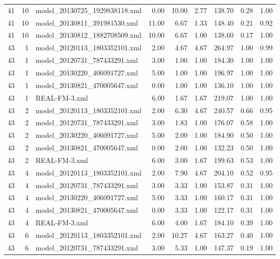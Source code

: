 \begin{table}[ht]
\begin{tabular}{rrlrrrrrr}
   41 &  10 & model\_20130725\_1929838118.xml & 0.00 & 10.00 & 2.77 & 138.70 & 0.28 & 1.00 \\ 
   41 &  10 & model\_20130811\_391981530.xml & 11.00 & 6.67 & 1.33 & 148.40 & 0.21 & 0.92 \\ 
   41 &  10 & model\_20130812\_1882708509.xml & 10.00 & 6.67 & 1.00 & 138.60 & 0.17 & 1.00 \\ 
   43 &   1 & model\_20120113\_1803352101.xml & 2.00 & 4.67 & 4.67 & 264.97 & 1.00 & 0.99 \\ 
   43 &   1 & model\_20120731\_787433291.xml & 3.00 & 1.00 & 1.00 & 184.30 & 1.00 & 1.00 \\ 
   43 &   1 & model\_20130220\_406091727.xml & 5.00 & 1.00 & 1.00 & 196.97 & 1.00 & 1.00 \\ 
   43 &   1 & model\_20130821\_470005647.xml & 0.00 & 1.00 & 1.00 & 136.10 & 1.00 & 1.00 \\ 
   43 &   1 & REAL-FM-3.xml & 6.00 & 1.67 & 1.67 & 219.07 & 1.00 & 1.00 \\ 
   43 &   2 & model\_20120113\_1803352101.xml & 2.00 & 6.30 & 4.67 & 240.57 & 0.66 & 0.95 \\ 
   43 &   2 & model\_20120731\_787433291.xml & 3.00 & 1.83 & 1.00 & 176.07 & 0.58 & 1.00 \\ 
   43 &   2 & model\_20130220\_406091727.xml & 5.00 & 2.00 & 1.00 & 184.90 & 0.50 & 1.00 \\ 
   43 &   2 & model\_20130821\_470005647.xml & 0.00 & 2.00 & 1.00 & 132.23 & 0.50 & 1.00 \\ 
   43 &   2 & REAL-FM-3.xml & 6.00 & 3.00 & 1.67 & 199.63 & 0.53 & 1.00 \\ 
   43 &   4 & model\_20120113\_1803352101.xml & 2.00 & 7.90 & 4.67 & 204.10 & 0.52 & 0.95 \\ 
   43 &   4 & model\_20120731\_787433291.xml & 3.00 & 3.33 & 1.00 & 153.87 & 0.31 & 1.00 \\ 
   43 &   4 & model\_20130220\_406091727.xml & 5.00 & 3.33 & 1.00 & 160.17 & 0.31 & 1.00 \\ 
   43 &   4 & model\_20130821\_470005647.xml & 0.00 & 3.33 & 1.00 & 122.17 & 0.31 & 1.00 \\ 
   43 &   4 & REAL-FM-3.xml & 6.00 & 4.00 & 1.67 & 184.10 & 0.39 & 1.00 \\ 
   43 &   6 & model\_20120113\_1803352101.xml & 2.00 & 10.27 & 4.67 & 163.27 & 0.40 & 1.00 \\ 
   43 &   6 & model\_20120731\_787433291.xml & 3.00 & 5.33 & 1.00 & 147.37 & 0.19 & 1.00 \\ 

\end{tabular}
\end{table}
